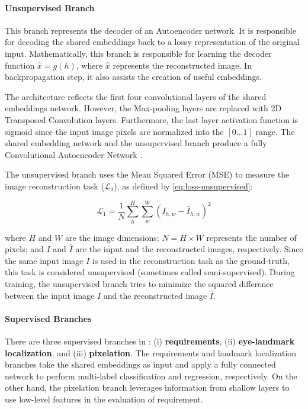 \paragraph{Unsupervised Branch}
 
This branch represents the decoder of an Autoencoder network. It is responsible for decoding the shared embeddings back to a lossy representation of the original input. Mathematically, this branch is responsible for learning the decoder function $\hat{x} = g(h)$, where $\hat{x}$ represents the reconstructed image. In backpropagation step, it also assists the creation of useful embeddings.
 
The architecture reflects the first four convolutional layers of the shared embeddings network. However, the Max-pooling layers are replaced with 2D Transposed Convolution layers. Furthermore, the last layer activation function is sigmoid since the input image pixels are normalized into the $[0...1]$ range. The shared embedding network and the unsupervised branch produce a fully Convolutional Autoencoder Network \citep{goodfellow2016deep}.
 
The unsupervised branch uses the Mean Squared Error (MSE) to measure the image reconstruction task ($\mathcal{L}_1$), as defined by \autoref{eq:loss-unsupervised}:
 
\begin{equation}
\label{eq:loss-unsupervised}
\mathcal{L}_1 = \frac{1}{N} \sum_h^H \sum_w^W ({I_{h,w} - \hat{I}_{h,w}})^2
\end{equation}
 
\noindent where $H$ and $W$ are the image dimensions; $N = H \times W$ represents the number of pixels; and $I$ and $\hat{I}$ are the input and the reconstructed images, respectively. Since the same input image $I$ is used in the reconstruction task as the ground-truth, this task is considered unsupervised (sometimes called semi-supervised). During training, the unsupervised branch tries to minimize the squared difference between the input image $I$ and the reconstructed image $\hat{I}$.
 
\paragraph{Supervised Branches} \label{sec:supervisedbranches}
 
There are three supervised branches in \methodname: (i) \textbf{requirements}, (ii) \textbf{ eye-landmark localization}, and (iii) \textbf{pixelation}. The requirements and landmark localization branches take the shared embeddings as input and apply a fully connected network to perform multi-label classification and regression, respectively. On the other hand, the pixelation branch leverages information from shallow layers to use low-level features in the evaluation of \pixelation requirement. 
 
